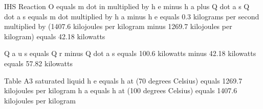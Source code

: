 IHS Reaction  
O equals m dot in multiplied by h e minus h a plus Q dot a s  
Q dot a s equals m dot multiplied by h a minus h e  
equals 0.3 kilograms per second multiplied by (1407.6 kilojoules per kilogram minus 1269.7 kilojoules per kilogram)  
equals 42.18 kilowatts  

Q a u s equals Q r minus Q dot a s equals 100.6 kilowatts minus 42.18 kilowatts equals 57.82 kilowatts  

Table A3 saturated liquid  
h e equals h at (70 degrees Celsius) equals 1269.7 kilojoules per kilogram  
h a equals h at (100 degrees Celsius) equals 1407.6 kilojoules per kilogram